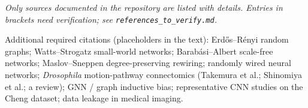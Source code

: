 \noindent \emph{Only sources documented in the repository are listed with details. Entries in brackets need verification; see \texttt{references\_to\_verify.md}.}

\noindent Additional required citations (placeholders in the text): Erdős–Rényi random graphs; Watts–Strogatz small-world networks; Barabási–Albert scale-free networks; Maslov–Sneppen degree-preserving rewiring; randomly wired neural networks; \emph{Drosophila} motion-pathway connectomics (Takemura et al.; Shinomiya et al.; a review); GNN / graph inductive bias; representative CNN studies on the Cheng dataset; data leakage in medical imaging.
